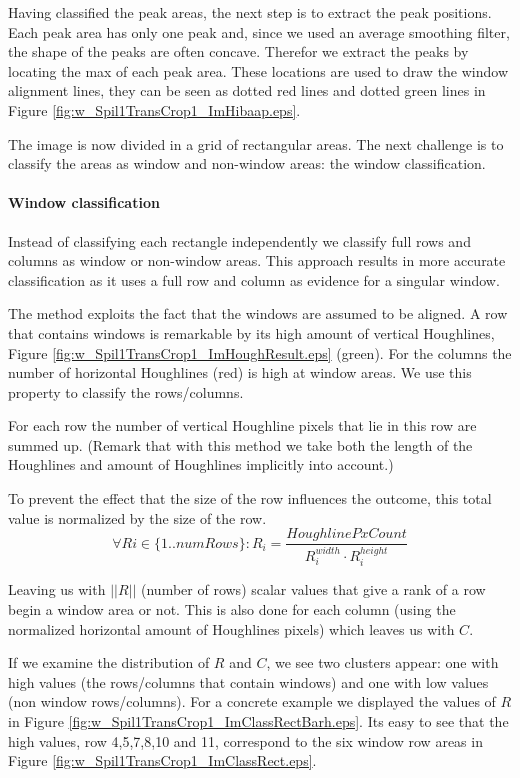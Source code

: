 Having classified the peak areas, the next step is to extract the peak positions. 
Each peak area has only one peak and, since we used an average smoothing filter, the shape of 
the peaks are often concave. Therefor we extract the peaks by locating the max of each peak area. 
These locations are used to draw the window alignment lines, they can be seen
as dotted red lines and dotted green lines in Figure \ref{fig:w_Spil1TransCrop1_ImHibaap.eps}.

The image is now divided in a grid of rectangular areas. The next challenge is to 
classify the areas as window and non-window areas: the window classification.

\paragraph{Window classification}
Instead of classifying each rectangle independently we classify full rows and
columns as window or non-window areas.  This approach results in more accurate
classification as it uses a full row and column as evidence for a singular
window. 

The method exploits the fact that the windows are assumed to be
aligned.
A row that contains windows is remarkable by its high amount of vertical
Houghlines, Figure \ref{fig:w_Spil1TransCrop1_ImHoughResult.eps}
(green). For the columns the number of horizontal Houghlines
 (red) is high at window areas.  We use this property to classify 
 the rows/columns. 

For each row the number of vertical Houghline pixels that lie in this row are summed up.
(Remark that with this method we take both the length of the Houghlines and amount of Houghlines 
implicitly into account.)

To prevent the effect that the size of the row influences the outcome, this total value
is normalized by the size of the row.
\[\forall Ri\in \{1..numRows\} : R_i = \frac{HoughlinePxCount}{R_i^{width} \cdot R_i^{height}}\]

Leaving us with $||R||$ (number of rows) scalar values that give a rank of a row begin a window area or not.
This is also done for each column (using the normalized horizontal amount of
Houghlines pixels) which leaves us with $C$.

If we examine the distribution of $R$ and $C$, we see two clusters appear: one with
high values (the rows/columns that contain windows) and one with low values (non window
rows/columns). For a concrete example we displayed the values of $R$ in Figure \ref{fig:w_Spil1TransCrop1_ImClassRectBarh.eps}.
Its easy to see that the high values, row 4,5,7,8,10 and 11, correspond to the
six window row areas in Figure \ref{fig:w_Spil1TransCrop1_ImClassRect.eps}.

